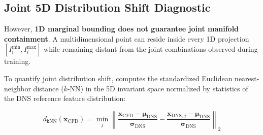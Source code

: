 \documentclass[11pt,a4paper]{article}
\begin{document}
\begin{table}[htbp]
\centering
\caption{Empirical bounds and marginal coverage of Cayley-Hamilton invariants across the live CFD domain.}
\label{tab:marginal_bounds}
\end{table}

\subsection{Joint 5D Distribution Shift Diagnostic}
However, \textbf{1D marginal bounding does not guarantee joint manifold containment}. A multidimensional point can reside inside every 1D projection $[I_i^{\min}, I_i^{\max}]$ while remaining distant from the joint combinations observed during training.

\begin{sloppypar}
To quantify joint distribution shift,  computes the standardized Euclidean nearest-neighbor distance ($k$-NN) in the 5D invariant space normalized by statistics of the DNS reference feature distribution:
\end{sloppypar}
\begin{equation}
d_{\text{kNN}}(\mathbf{x}_{\text{CFD}}) = \min_{j} \left\| \frac{\mathbf{x}_{\text{CFD}} - \boldsymbol{\mu}_{\text{DNS}}}{\boldsymbol{\sigma}_{\text{DNS}}} - \frac{\mathbf{x}_{\text{DNS}, j} - \boldsymbol{\mu}_{\text{DNS}}}{\boldsymbol{\sigma}_{\text{DNS}}} \right\|_2
\end{equation}
\end{document}
